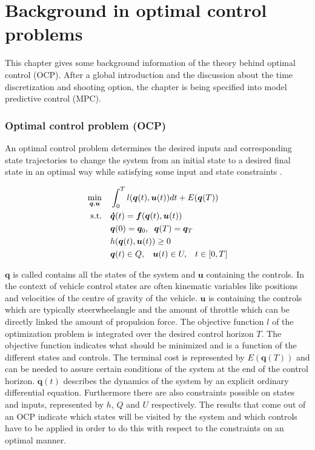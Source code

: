 \chapter{Background in optimal control problems\\}
\label{cha:OCP}

This chapter gives some background information of the theory behind optimal control (OCP). After a global introduction and the discussion about the time discretization and shooting option, the chapter is being specified into model predictive control (MPC).\\

\subsection{Optimal control problem (OCP)}
An optimal control problem determines the desired inputs and corresponding state trajectories to change the system from an initial state to a desired final state in an optimal way while satisfying some input and state constraints \cite{Mercy2018}.

\begin{equation}
\label{eq:OCP}
\begin{aligned}
\min_{\bm{q},\bm{u}} \quad & \int_{0}^{T}l(\bm{q}(t),\bm{u}(t))dt + E(\bm{q}(T)) \\
\textrm{s.t.} \quad & \bm{\dot{q}}(t) = \bm{f}(\bm{q}(t), \bm{u}(t))\\
& \bm{q}(0)= \bm{q}_{0},\hspace{2 mm}\bm{q}(T)= \bm{q}_{T}    \\
& h(\bm{q}(t),\bm{u}(t)) \geq 0	\\
& \bm{q}(t)\in Q,\hspace{3 mm} \bm{u}(t)\in U, \hspace{3 mm} t\in [0, T]
\end{aligned}
\end{equation}

$\bm{q}$ is called contains all the states of the system and $\bm{u}$ containing the controls. In the context of vehicle control states are often kinematic variables like positions and velocities of the centre of gravity of the vehicle. $\bm{u}$ is containing the controls which are typically steerwheelangle and the amount of throttle which can be directly linked the amount of propulsion force. The objective function $l$ of the optimization problem is integrated over the desired control horizon $T$. The objective function indicates what should be minimized and is a function of the different states and controls. The terminal cost is represented by $E(\bm{q}(T))$ and can be needed to assure certain conditions of the system at the end of the control horizon. $\bm{\dot{q}}(t)$ describes the dynamics of the system by an explicit ordinary differential equation. Furthermore there are also constraints possible on states and inputs, represented by $h$, $Q$ and $U$ respectively. The results that come out of an OCP indicate which states will be visited by the system and which controls have to be applied in order to do this with respect to the constraints on an optimal manner. \cite{Patrinos2019}\\ 

